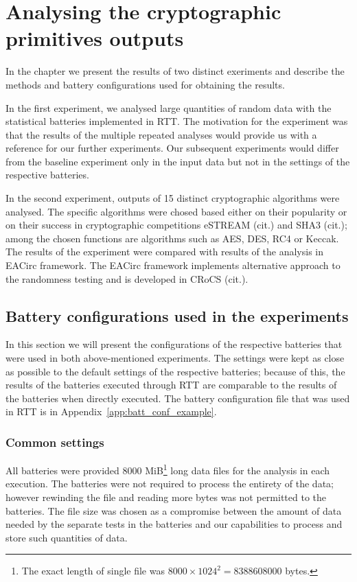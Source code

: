 \documentclass[
  digital,  	%
  color,		%
  oneside,   	%
  12pt,
  nocover,
  notable,
  nolof,
  nolot,
]{fithesis3}
\theoremstyle{definition}
\theoremstyle{remark}
\begin{document}
\chapter{Analysing the cryptographic primitives outputs}
\label{chap:crypto_fn_analysis}

In the chapter we present the results of two distinct exeriments and describe the methods and battery configurations used for obtaining the results.

In the first experiment, we analysed large quantities of random data with the statistical batteries implemented in RTT. The motivation for the experiment was that the results of the multiple repeated analyses would provide us with a reference for our further experiments. Our subsequent experiments would differ from the baseline experiment only in the input data but not in the settings of the respective batteries.

In the second experiment, outputs of 15 distinct cryptographic algorithms were analysed. The specific algorithms were chosed based either on their popularity or on their success in cryptographic competitions eSTREAM (cit.) and SHA3 (cit.); among the chosen functions are algorithms such as AES, DES, RC4 or Keccak. The results of the experiment were compared with results of the analysis in EACirc framework. The EACirc framework implements alternative approach to the randomness testing and is developed in CRoCS (cit.).

\section{Battery configurations used in the experiments}
\label{sec:configuration_of_batteries}
In this section we will present the configurations of the respective batteries that were used in both above-mentioned experiments. The settings were kept as close as possible to the default settings of the respective batteries; because of this, the results of the batteries executed through RTT are comparable to the results of the batteries when directly executed. The battery configuration file that was used in RTT is in Appendix~\ref{app:batt_conf_example}.

\subsection{Common settings}
All batteries were provided 8000 MiB\footnote{The exact length of single file was $8000 \times 1024^2 = 8388608000$ bytes.} long data files for the analysis in each execution. The batteries were not required to process the entirety of the data; however rewinding the file and reading more bytes was not permitted to the batteries. The file size was chosen as a compromise between the amount of data needed by the separate tests in the batteries and our capabilities to process and store such quantities of data.
\end{document}
